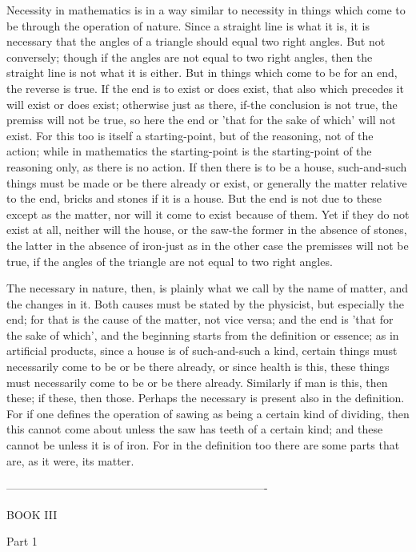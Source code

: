 Necessity in mathematics is in a way similar to necessity in things
which come to be through the operation of nature. Since a straight
line is what it is, it is necessary that the angles of a triangle
should equal two right angles. But not conversely; though if the angles
are not equal to two right angles, then the straight line is not what
it is either. But in things which come to be for an end, the reverse
is true. If the end is to exist or does exist, that also which precedes
it will exist or does exist; otherwise just as there, if-the conclusion
is not true, the premiss will not be true, so here the end or 'that
for the sake of which' will not exist. For this too is itself a starting-point,
but of the reasoning, not of the action; while in mathematics the
starting-point is the starting-point of the reasoning only, as there
is no action. If then there is to be a house, such-and-such things
must be made or be there already or exist, or generally the matter
relative to the end, bricks and stones if it is a house. But the end
is not due to these except as the matter, nor will it come to exist
because of them. Yet if they do not exist at all, neither will the
house, or the saw-the former in the absence of stones, the latter
in the absence of iron-just as in the other case the premisses will
not be true, if the angles of the triangle are not equal to two right
angles. 

The necessary in nature, then, is plainly what we call by the name
of matter, and the changes in it. Both causes must be stated by the
physicist, but especially the end; for that is the cause of the matter,
not vice versa; and the end is 'that for the sake of which', and the
beginning starts from the definition or essence; as in artificial
products, since a house is of such-and-such a kind, certain things
must necessarily come to be or be there already, or since health is
this, these things must necessarily come to be or be there already.
Similarly if man is this, then these; if these, then those. Perhaps
the necessary is present also in the definition. For if one defines
the operation of sawing as being a certain kind of dividing, then
this cannot come about unless the saw has teeth of a certain kind;
and these cannot be unless it is of iron. For in the definition too
there are some parts that are, as it were, its matter. 

----------------------------------------------------------------------

BOOK III

Part 1 

